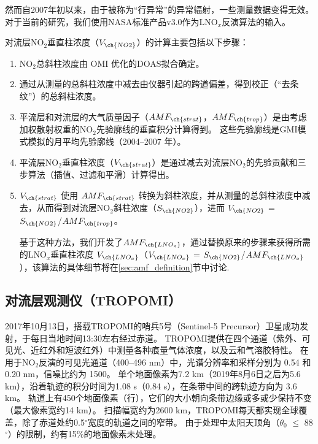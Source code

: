 然而自2007年初以来，由于被称为“行异常”的异常辐射\citep{Dobber.2008}，一些测量数据变得无效。
对于当前的研究，我们使用NASA标准产品v3.0\citep{Krotkov.2017}作为LNO$_x$反演算法的输入。

对流层NO$_2$垂直柱浓度（$V_{\ch{NO2}}$）的计算主要包括以下步骤：

\begin{enumerate}[label=（\arabic*）, labelindent=\parindent, nosep, leftmargin=0pt, widest=0, itemindent=*, topsep=0pt, partopsep=0pt, parsep=0pt]

\item NO$_2$总斜柱浓度由 OMI 优化的DOAS拟合确定。

\item 通过从测量的总斜柱浓度中减去由仪器引起的跨道偏差，得到校正（“去条纹”）的总斜柱浓度。

\item 平流层和对流层的大气质量因子（$AMF_{\ch{strat}}$，$AMF_{\ch{trop}}$）是由考虑加权散射权重的NO$_2$先验廓线的垂直积分计算得到。
这些先验廓线是GMI模式模拟的月平均先验廓线（2004--2007 年）。

\item 平流层NO$_2$垂直柱浓度（$V_{\ch{strat}}$）是通过减去对流层NO$_2$的先验贡献和三步算法（插值、过滤和平滑）计算得出\citep{Bucsela.2013}。

\item $V_{\ch{strat}}$ 使用 $AMF_{\ch{strat}}$ 转换为斜柱浓度，并从测量的总斜柱浓度中减去，从而得到对流层NO$_2$斜柱浓度（$S_{\ch{NO2}}$），进而 $V_{\ch{NO2}}$ = $S_{\ch{NO2}}$/$AMF_{\ch{trop}}$。

基于这种方法，我们开发了$AMF_{\ch{LNO_x}}$，通过替换原来的步骤来获得所需的LNO$_x$垂直柱浓度 $V_{\ch{LNO_x}}$（$V_{\ch{LNO_x}}$ = $S_{\ch{NO2}}$/$AMF_{\ch{LNO_x}}$），该算法的具体细节将在\ref{sec:amf_definition}节中讨论.

\end{enumerate}

\subsection{对流层观测仪（TROPOMI）}

2017年10月13日，搭载TROPOMI的哨兵5号（Sentinel-5 Precursor）卫星成功发射\citep{Veefkind.2012}，于每日当地时间13:30左右经过赤道。
TROPOMI提供在四个通道（紫外、可见光、近红外和短波红外）中测量各种痕量气体浓度，以及云和气溶胶特性。
在用于NO$_2$反演的可见光通道（400–496 nm）中，光谱分辨率和采样分别为 0.54 和 0.20 nm，信噪比约为 1500。
单个地面像素为7.2 km（2019年8月6日之后为5.6 km），沿着轨迹的积分时间为1.08 s（0.84 s），在条带中间的跨轨迹方向为 3.6 km。
轨道上有450个地面像素（行），它们的大小朝向条带边缘或多或少保持不变（最大像素宽约14 km）。
扫描幅宽约为2600 km，TROPOMI每天都实现全球覆盖，除了赤道处约0.5$^{\circ}$宽度的轨道之间的窄带。
由于处理中太阳天顶角（$\theta_0$ $\leq$ 88$^{\circ}$）的限制，约有15\%的地面像素未处理。

